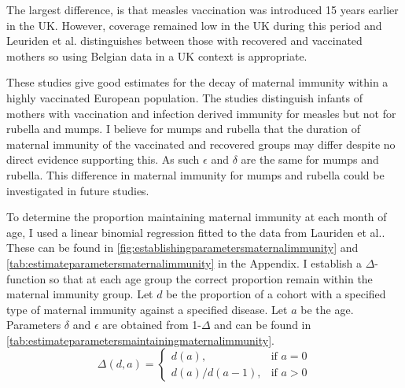 \documentclass[a4paper,11pt] {scrartcl}
\begin{document}
The largest difference, is that measles vaccination was introduced 15 years earlier in the UK. However, coverage remained low in the UK during this period\cite{hpaimmunistationcoverage} and Leuriden et al.\cite{leuridan2010early} distinguishes between those with recovered and vaccinated mothers so using Belgian data in a UK context is appropriate.

These studies give good estimates for the decay of maternal immunity within a highly vaccinated European population. The studies distinguish infants of mothers with vaccination and infection derived immunity for measles but not for rubella and mumps. I believe for mumps and rubella that the duration of maternal immunity of the vaccinated and recovered groups may differ despite no direct evidence supporting this. As such $\epsilon$ and $\delta$ are the same for mumps and rubella. This difference in maternal immunity for mumps and rubella could be investigated in future studies. 

To determine the proportion maintaining maternal immunity at each month of age, I used a linear binomial regression fitted to the data from Lauriden et al.\cite{leuridan2010early,leuridan2011kinetics,leuridan2012maternal}. These can be found in \autoref{fig:establishingparametersmaternalimmunity} and \autoref{tab:estimateparametersmaternalimmunity} in the Appendix. I establish a $\Delta$-function so that at each age group the correct proportion remain within the maternal immunity group. Let $d$ be the proportion of a cohort with a specified type of maternal immunity against a specified disease. Let $a$ be the age. Parameters $\delta$ and $\epsilon$ are obtained from 1-$\Delta$ and can be found in \autoref{tab:estimateparametersmaintainingmaternalimmunity}.
\begin{equation*}
\Delta(d,a) = \begin{cases} d(a), & \mbox{if } a = 0 \\ d(a)/d(a-1) , & \mbox{if } a>0 \end{cases}
\end{equation*}
\end{document}
